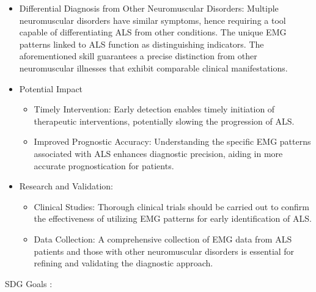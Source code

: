 \documentclass[ 12pt,a4paper,twocolumn,fleqn]{report}
\begin{document}
\begin{itemize}
    \item Differential Diagnosis from Other Neuromuscular Disorders:
Multiple neuromuscular disorders have similar symptoms, hence requiring a tool capable of differentiating ALS from other conditions. The unique EMG patterns linked to ALS function as distinguishing indicators. The aforementioned skill guarantees a precise distinction from other neuromuscular illnesses that exhibit comparable clinical manifestations.
\item Potential Impact
\begin{itemize}

\item Timely Intervention: Early detection enables timely initiation of therapeutic
interventions, potentially slowing the progression of ALS.
\item Improved Prognostic Accuracy: Understanding the specific EMG patterns associated
with ALS enhances diagnostic precision, aiding in more accurate prognostication for
patients.
\end{itemize}
\item Research and Validation:
\begin{itemize}

\item Clinical Studies: Thorough clinical trials should be carried out to confirm the effectiveness of utilizing EMG patterns for early identification of ALS.
\item Data Collection: A comprehensive collection of EMG data from ALS patients and those
with other neuromuscular disorders is essential for refining and validating the diagnostic
approach.
\end{itemize}
\end{itemize}
SDG Goals : 

\newpage
  \pagestyle{fancy}
\thisfancypage{%
  \setlength{\fboxsep}{20pt}\doublebox}{}
\normalsize

\newpage
  \pagestyle{fancy}
\thisfancypage{%
  \setlength{\fboxsep}{20pt}\doublebox}{}
\normalsize
\end{document}
